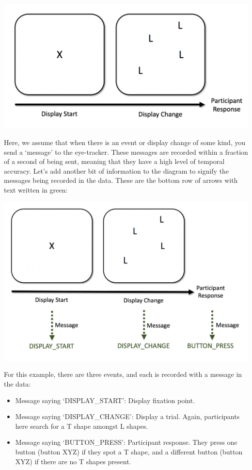 \documentclass[]{book}
\providecommand{\tightlist}{%
  \setlength{\itemsep}{0pt}\setlength{\parskip}{0pt}}
\begin{document}
\includegraphics[width=15.22in]{files/images/baseTrial}

Here, we assume that when there is an event or display change of some kind, you send a `message' to the eye-tracker. These messages are recorded within a fraction of a second of being sent, meaning that they have a high level of temporal accuracy. Let's add another bit of information to the diagram to signify the messages being recorded in the data. These are the bottom row of arrows with text written in green:

\includegraphics[width=18.81in]{files/images/baseTrialMessages}

For this example, there are three events, and each is recorded with a message in the data:

\begin{itemize}
\tightlist
\item
  Message saying `DISPLAY\_START': Display fixation point.
\item
  Message saying `DISPLAY\_CHANGE': Display a trial. Again, participants here search for a T shape amongst L shapes.
\item
  Message saying `BUTTON\_PRESS': Participant response. They press one button (button XYZ) if they spot a T shape, and a different button (button XYZ) if there are no T shapes present.
\end{itemize}
\end{document}
